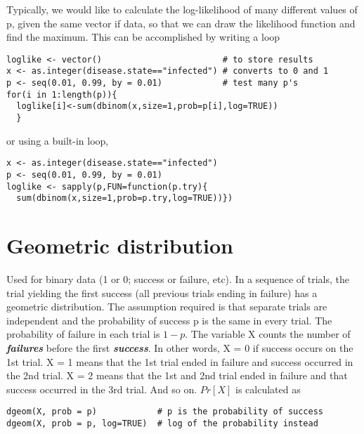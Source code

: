 \documentclass[12pt, a4paper]{article}
\theoremstyle{plain}
\theoremstyle{definition}
\theoremstyle{remark}
\begin{document}
Typically, we would like to calculate the log-likelihood of many different values of p, given the same vector if data, so that we can draw the likelihood function and find the maximum. This can be accomplished by writing a loop
\begin{framed}
\begin{verbatim}
loglike <- vector()                        # to store results
x <- as.integer(disease.state=="infected") # converts to 0 and 1
p <- seq(0.01, 0.99, by = 0.01)            # test many p's
for(i in 1:length(p)){
  loglike[i]<-sum(dbinom(x,size=1,prob=p[i],log=TRUE))
  }
\end{verbatim}
\end{framed}

or using a built-in loop,
\begin{framed}
\begin{verbatim}
x <- as.integer(disease.state=="infected")
p <- seq(0.01, 0.99, by = 0.01)
loglike <- sapply(p,FUN=function(p.try){
  sum(dbinom(x,size=1,prob=p.try,log=TRUE))})
\end{verbatim}
\end{framed}
\newpage
\section{Geometric distribution}
Used for binary data (1 or 0; success or failure, etc). In a sequence of trials, the trial yielding the first success (all previous trials ending in failure) has a geometric distribution. The assumption required is that separate trials are independent and the probability of success p is the same in every trial. The probability of failure in each trial is $1 - p$.
\newpage
The variable X counts the number of \textbf{\textit{failures}} before the first \textbf{\textit{success}}. In other words, X = 0 if success occurs on the 1st trial. X = 1 means that the 1st trial ended in failure and success occurred in the 2nd trial. X = 2 means that the 1st and 2nd trial ended in failure and that success occurred in the 3rd trial. And so on. $Pr[X]$ is calculated as
\begin{framed}
\begin{verbatim}
dgeom(X, prob = p)            # p is the probability of success
dgeom(X, prob = p, log=TRUE)  # log of the probability instead
\end{verbatim}
\end{framed}

\newpage
\end{document}
